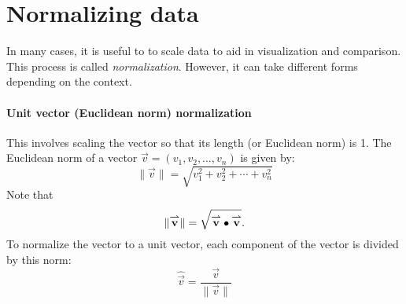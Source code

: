 \documentclass{ximera}
\begin{document}

\section{Normalizing data}

In many cases, it is useful to to scale data to aid in visualization
and comparison. This process is called
\textit{normalization}. However, it can take different forms depending
on the context.



\paragraph{Unit vector (Euclidean norm) normalization}

This involves scaling the vector so that its length (or Euclidean
norm) is 1. The Euclidean norm of a vector \(\vec{v} = (v_1, v_2,
\ldots, v_n)\) is given by:
\[
\|\vec{v}\| = \sqrt{v_1^2 + v_2^2 + \cdots + v_n^2}
\]
Note that
\[
\|{\overset{\boldsymbol{\rightharpoonup}}{\mathbf{v}}}\hspace{0in}\| = \sqrt{{\overset{\boldsymbol{\rightharpoonup}}{\mathbf{v}}}\hspace{0in}\bullet{\overset{\boldsymbol{\rightharpoonup}}{\mathbf{v}}}\hspace{0in}}.
\]
To normalize the vector to a unit vector, each component of the vector is divided by this norm:
\[ \hat{\vec{v}} = \frac{\vec{v}}{\|\vec{v}\|} \]
\end{document}
